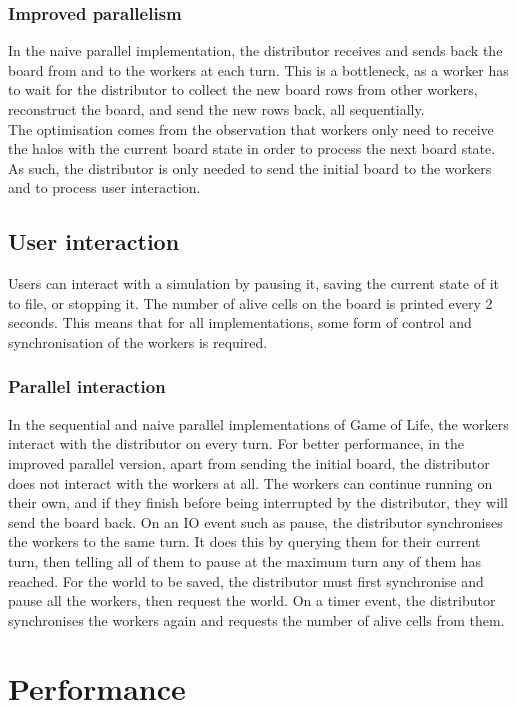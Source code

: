 \documentclass[a4, 11pt]{article}
\begin{document}
\begin{multicols}{2}
\subsubsection{Improved parallelism}
In the naive parallel implementation, the distributor receives and sends back the board from and to the workers at each turn. This is a bottleneck, as a worker has to wait for the distributor to collect the new board rows from other workers, reconstruct the board, and send the new rows back, all sequentially. \\
The optimisation comes from the observation that workers only need to receive the halos with the current board state in order to process the next board state. As such, the distributor is only needed to send the initial board to the workers and to process user interaction.


\subsection{User interaction}

Users can interact with a simulation by pausing it, saving the current state of it to file, or stopping it. The number of alive cells on the board is printed every 2 seconds. This means that for all implementations, some form of control and synchronisation of the workers is required.

\subsubsection{Parallel interaction}
In the sequential and naive parallel implementations of Game of Life, the workers interact with the distributor on every turn. For better performance, in the improved parallel version, apart from sending the initial board, the distributor does not interact with the workers at all. The workers can continue running on their own, and if they finish before being interrupted by the distributor, they will send the board back. On an IO event such as pause, the distributor synchronises the workers to the same turn. It does this by querying them for their current turn, then telling all of them to pause at the maximum turn any of them has reached. For the world to be saved, the distributor must first synchronise and pause all the workers, then request the world. On a timer event, the distributor synchronises the workers again and requests the number of alive cells from them.

\section{Performance}


\end{multicols}
\end{document}
